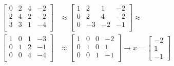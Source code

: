 \documentclass{article}
\newcommand{\1}{\mathbf{1}}
\begin{document}
\begin{enumerate}
\begin{align*}
	    \left[\begin{array}{ccc|c} 
	    0 & 2 & 4 & -2 \\ 2 & 4 & 2 & -2 \\ 3 & 3 & 1 & -4 \\
	    \end{array} \right] &\approx 
	    \left[\begin{array}{ccc|c} 
	    1 & 2 & 1 & -2 \\ 0 & 2 & 4 & -2 \\ 0 & -3 & -2 & -1 \\
	    \end{array} \right] \approx \\
	    \left[\begin{array}{ccc|c} 
	    1 & 0 & 1 & -3 \\ 0 & 1 & 2 & -1 \\ 0 & 0 & 4 & -4 \\
	    \end{array} \right] &\approx
	    \left[\begin{array}{ccc|c} 
	    1 & 0 & 0 & -2 \\ 0 & 1 & 0 & 1 \\ 0 & 0 & 1 & -1 \\
	    \end{array} \right] 
	    \rightarrow x = \begin{bmatrix} -2 \\ 1 \\ -1 \end{bmatrix}
	\end{align*}
\end{enumerate}
\end{document}
